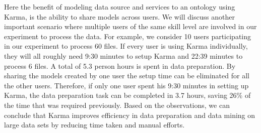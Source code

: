 Here the benefit of modeling data source and services to an ontology using Karma, is the ability to share models across users. We will discuss another important scenario where multiple users of the same skill level are involved in our experiment to process the data. For example, we consider 10 users participating in our experiment to process 60 files. If every user is using Karma individually, they will all roughly need 9:30 minutes to setup Karma and 22:39 minutes to process 6 files. A total of 5.3 person hours is spent in data preparation. By sharing the models created by one user the setup time can be eliminated for all the other users. Therefore, if only one user spent his 9:30 minutes in setting up Karma, the data preparation task can be completed in 3.7 hours, saving 26\% of the time that was required previously. Based on the observations, we can conclude that Karma improves efficiency in data preparation and data mining on large data sets by reducing time taken and manual efforts.
